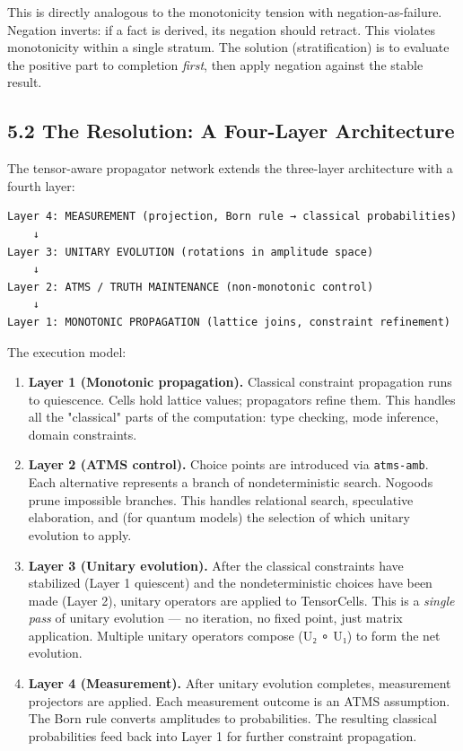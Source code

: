 \documentclass[11pt]{article}
\begin{document}
This is directly analogous to the monotonicity tension with negation-as-failure.
Negation inverts: if a fact is derived, its negation should retract. This violates
monotonicity within a single stratum. The solution (stratification) is to evaluate
the positive part to completion \emph{first}, then apply negation against the stable
result.
\subsection{5.2 The Resolution: A Four-Layer Architecture}
\label{sec:org00e10e8}

The tensor-aware propagator network extends the three-layer architecture with
a fourth layer:

\begin{verbatim}
Layer 4: MEASUREMENT (projection, Born rule → classical probabilities)
    ↓
Layer 3: UNITARY EVOLUTION (rotations in amplitude space)
    ↓
Layer 2: ATMS / TRUTH MAINTENANCE (non-monotonic control)
    ↓
Layer 1: MONOTONIC PROPAGATION (lattice joins, constraint refinement)
\end{verbatim}

The execution model:

\begin{enumerate}
\item \textbf{Layer 1 (Monotonic propagation).} Classical constraint propagation runs to
quiescence. Cells hold lattice values; propagators refine them. This handles
all the "classical" parts of the computation: type checking, mode inference,
domain constraints.

\item \textbf{Layer 2 (ATMS control).} Choice points are introduced via \texttt{atms-amb}. Each
alternative represents a branch of nondeterministic search. Nogoods prune
impossible branches. This handles relational search, speculative elaboration,
and (for quantum models) the selection of which unitary evolution to apply.

\item \textbf{Layer 3 (Unitary evolution).} After the classical constraints have stabilized
(Layer 1 quiescent) and the nondeterministic choices have been made (Layer 2),
unitary operators are applied to TensorCells. This is a \emph{single pass} of
unitary evolution --- no iteration, no fixed point, just matrix application.
Multiple unitary operators compose (U₂ ∘ U₁) to form the net evolution.

\item \textbf{Layer 4 (Measurement).} After unitary evolution completes, measurement
projectors are applied. Each measurement outcome is an ATMS assumption.
The Born rule converts amplitudes to probabilities. The resulting classical
probabilities feed back into Layer 1 for further constraint propagation.
\end{enumerate}
\end{document}
